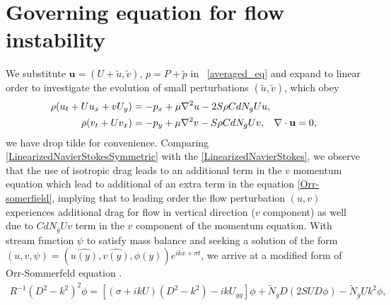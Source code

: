 \documentclass[12pt]{report}   %
\newcommand{\bu}{\mathbf{u}}
\newcommand{\Rey}{{R}}
\newcommand{\Ndg}{\tilde{N}_g}
\begin{document}
\section{Governing equation for flow instability}
We substitute $\bu = (U+\tilde{u}, \tilde{v})$, $p=P+\tilde{p}$ in ~\eqref{averaged_eq} and expand to linear order to investigate the evolution of small perturbations $(\tilde{u}, \tilde{v})$, which obey 
\begin{equation}
\begin{split}
\rho(u_t+U u_x+vU_y) &= -p_x+ {\mu}\nabla^2u-2S\rho C dN_{g}Uu, \\
\rho(v_t+ Uv_x) &= -p_y+ {\mu}\nabla^2v - S\rho C d N_g Uv, \hspace{0.3cm} \nabla\cdot\bu=0,
\label{LinearizedNavierStokesSymmetric}
\end{split} 
\end{equation}
we have drop tilde for convenience. Comparing \eqref{LinearizedNavierStokesSymmetric} with the \eqref{LinearizedNavierStokes}, we observe that the use of isotropic drag leads to an additional term in the $v$ momentum equation which lead to additional of an extra term in the equation  \ref{Orr-somerfield}, implying that to leading order the flow perturbation $(u,v)$ experiences additional drag for flow in vertical direction ($v$ component) as well due to $C d N_g Uv$ term in the $v$ component of the momentum equation. With stream function $\psi$ to satisfy mass balance and seeking a solution of the form $(u,v,\psi) = (\hat{u(y)},\hat{v(y)},\phi(y)) e^{ikx+\sigma t}$, we arrive at a modified form of Orr-Sommerfeld equation \cite{Drazin81,Chen97,Chu91}.
\begin{equation}
\begin{split}
\Rey^{-1}\left(D^2 -k^{2} \right)^2\phi = \left[ \left({\sigma}+ikU\right) \left(D^2-k^2\right) -ikU_{yy}\right]\phi + 
\Ndg D\left(2 S U D \phi\right) - \Ndg U k^2\phi,
\label{SymmetricOrr-somerfield}
\end{split}
\end{equation}
\end{document}
